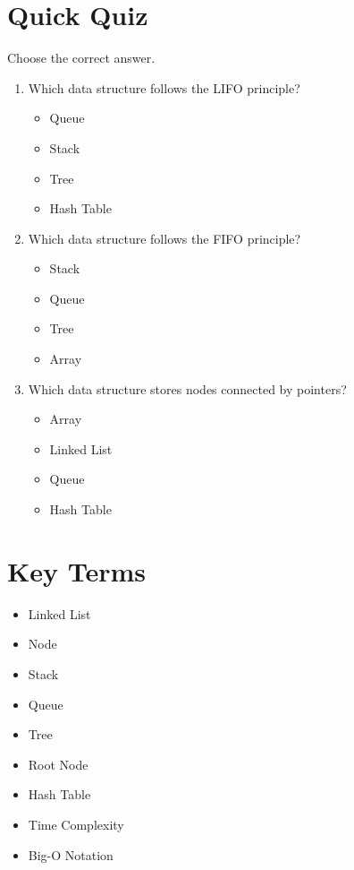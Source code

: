 \documentclass[12pt,openany]{book}
\begin{document}
\section{Quick Quiz}

Choose the correct answer.

\begin{enumerate}
    \item Which data structure follows the LIFO principle?
    \begin{itemize}
        \item Queue
        \item Stack
        \item Tree
        \item Hash Table
    \end{itemize}

    \item Which data structure follows the FIFO principle?
    \begin{itemize}
        \item Stack
        \item Queue
        \item Tree
        \item Array
    \end{itemize}

    \item Which data structure stores nodes connected by pointers?
    \begin{itemize}
        \item Array
        \item Linked List
        \item Queue
        \item Hash Table
    \end{itemize}
\end{enumerate}

\section{Key Terms}

\begin{itemize}
    \item Linked List
    \item Node
    \item Stack
    \item Queue
    \item Tree
    \item Root Node
    \item Hash Table
    \item Time Complexity
    \item Big-O Notation
\end{itemize}
\end{document}
